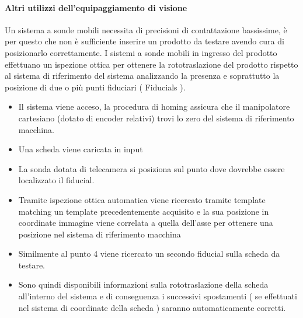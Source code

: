 \paragraph{Altri utilizzi dell'equipaggiamento di visione}
Un sistema a sonde mobili necessita di precisioni di contattazione bassissime, è per questo che non è
sufficiente inserire un prodotto da testare avendo cura di posizionarlo correttamente.
I sistemi a sonde mobili in ingresso del prodotto effettuano un ispezione ottica per ottenere la
rototraslazione del prodotto rispetto al sistema di riferimento del sistema analizzando la presenza e
soprattutto la posizione di due o più punti fiduciari ( Fiducials ).

\begin{itemize}
\item Il sistema viene acceso, la procedura di homing assicura che il manipolatore cartesiano (dotato di
encoder relativi) trovi lo zero del sistema di riferimento macchina.
\item Una scheda viene caricata in input
\item La sonda dotata di telecamera si posiziona sul punto dove dovrebbe essere localizzato il fiducial.
\item Tramite ispezione ottica automatica viene ricercato tramite template matching un template
precedentemente acquisito e la sua posizione in coordinate immagine viene correlata a quella
dell’asse per ottenere una posizione nel sistema di riferimento macchina
\item Similmente al punto 4 viene ricercato un secondo fiducial sulla scheda da testare.
\item Sono quindi disponibili informazioni sulla rototraslazione della scheda all’interno del sistema e di
conseguenza i successivi spostamenti ( se effettuati nel sistema di coordinate della scheda )
saranno automaticamente corretti. 
\end{itemize}


